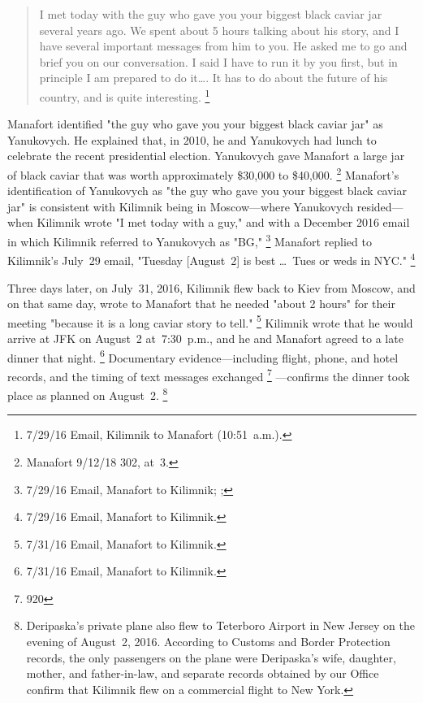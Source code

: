 \begin{quote}
I met today with the guy who gave you your biggest black caviar jar several years ago.
We spent about 5 hours talking about his story, and I have several important messages from him to you.
He asked me to go and brief you on our conversation.
I said I have to run it by you first, but in principle I am prepared to do it\dots.
It has to do about the future of his country, and is quite interesting.%
\footnote{7/29/16 Email, Kilimnik to Manafort (10:51~a.m.).}
\end{quote}

Manafort identified "the guy who gave you your biggest black caviar jar" as Yanukovych.
He explained that, in 2010, he and Yanukovych had lunch to celebrate the recent presidential election.
Yanukovych gave Manafort a large jar of black caviar that was worth approximately \$30,000 to \$40,000.%
\footnote{Manafort 9/12/18 302, at~3.}
Manafort's identification of Yanukovych as "the guy who gave you your biggest black caviar jar" is consistent with Kilimnik being in Moscow---where Yanukovych resided---when Kilimnik wrote "I met today with a guy," and with a December 2016 email in which Kilimnik referred to Yanukovych as "BG,"
\footnote{7/29/16 Email, Manafort to Kilimnik; ; }
Manafort replied to Kilimnik's July~29 email, "Tuesday [August~2] is best \dots\ Tues or weds in NYC."%
\footnote{7/29/16 Email, Manafort to Kilimnik.}

Three days later, on July~31, 2016, Kilimnik flew back to Kiev from Moscow, and on that same day, wrote to Manafort that he needed "about 2 hours" for their meeting "because it is a long caviar story to tell."%
\footnote{7/31/16 Email, Manafort to Kilimnik.}
Kilimnik wrote that he would arrive at JFK on August~2 at~7:30~p.m., and he and Manafort agreed to a late dinner that night.%
\footnote{7/31/16 Email, Manafort to Kilimnik.}
Documentary evidence---including flight, phone, and hotel records, and the timing of text messages exchanged%
\footnote{920}%
---confirms the dinner took place as planned on August~2.%
\footnote{Deripaska's private plane also flew to Teterboro Airport in New Jersey on the evening of August~2, 2016. According to Customs and Border Protection records, the only passengers on the plane were Deripaska's wife, daughter, mother, and father-in-law, and separate records obtained by our Office confirm that Kilimnik flew on a commercial flight to New York.}

